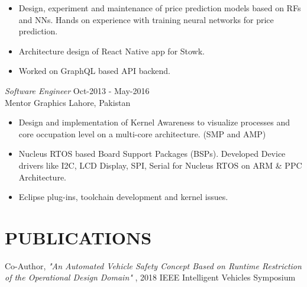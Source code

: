 \documentclass[margin, 10pt]{res} %
\begin{document}
\begin{resume}
\begin{itemize} \itemsep -2pt %
\item  Design, experiment and maintenance of price prediction models based on RFs and NNs. Hands on experience with training neural networks for price prediction.
\item Architecture design of React Native app for Stowk.
\item Worked on GraphQL based API backend.
\end{itemize} 
 
{\sl Software Engineer } \hfill Oct-2013 - May-2016 \\
Mentor Graphics  \hfill Lahore, Pakistan
\begin{itemize} \itemsep -2pt %
\item Design and implementation of Kernel Awareness to visualize processes and core occupation level on a multi-core architecture. (SMP and AMP)
\item Nucleus RTOS based Board Support Packages (BSPs). Developed Device drivers like I2C, LCD Display, SPI, Serial for Nucleus RTOS on ARM \& PPC Architecture.
\item Eclipse plug-ins, toolchain development and kernel issues.
\end{itemize} 




\section{PUBLICATIONS} 

Co-Author, \textit{"An Automated Vehicle Safety Concept Based on Runtime Restriction of the Operational Design Domain"} , 2018 IEEE Intelligent Vehicles Symposium


\end{resume}
\end{document}
